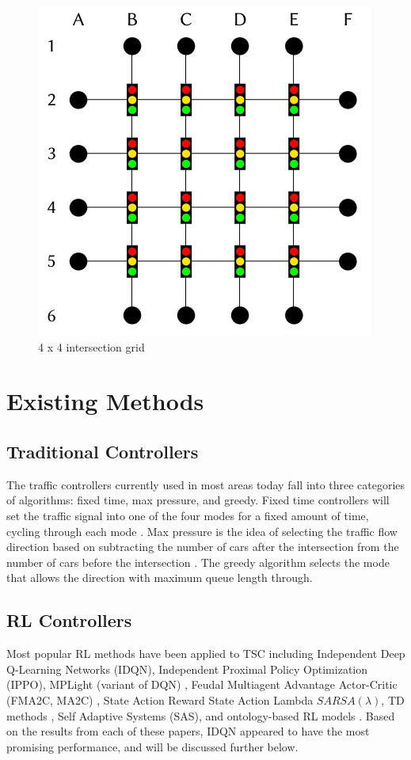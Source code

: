 \documentclass[letterpaper]{article} %
\begin{document}
\begin{figure}[htbp]
  \centering
  \includegraphics[width=0.6\linewidth]{4x4.png}
  \caption{4 x 4 intersection grid \cite{DBLP:journals/corr/abs-2004-04778}}
  \label{fig:intersection_grid}
\end{figure}

\section{Existing Methods}
\subsection{Traditional Controllers}
The traffic controllers currently used in most areas today fall into three categories of algorithms: fixed time, max pressure, and greedy.
Fixed time controllers will set the traffic signal into one of the four modes for a fixed amount of time, cycling through each mode \cite{ault2021reinforcement}.
Max pressure is the idea of selecting the traffic flow direction based on subtracting the number of cars after the intersection from the number of cars before the intersection \cite{Chen_Wei_Xu_Zheng_Yang_Xiong_Xu_Li_2020}.
The greedy algorithm selects the mode that allows the direction with maximum queue length through.

\subsection{RL Controllers}
Most popular RL methods have been applied to TSC including Independent Deep Q-Learning Networks (IDQN), Independent Proximal Policy Optimization (IPPO), MPLight (variant of DQN) \cite{Chen_Wei_Xu_Zheng_Yang_Xiong_Xu_Li_2020}, Feudal Multiagent Advantage Actor-Critic (FMA2C, MA2C) \cite{DBLP:journals/corr/abs-1903-04527}, State Action Reward State Action Lambda \(SARSA(\lambda)\), TD methods \cite{Reza2023}, Self Adaptive Systems (SAS), and ontology-based RL models \cite{Ghanadbashi2023}.
Based on the results from each of these papers, IDQN appeared to have the most promising performance, and will be discussed further below.
\end{document}
